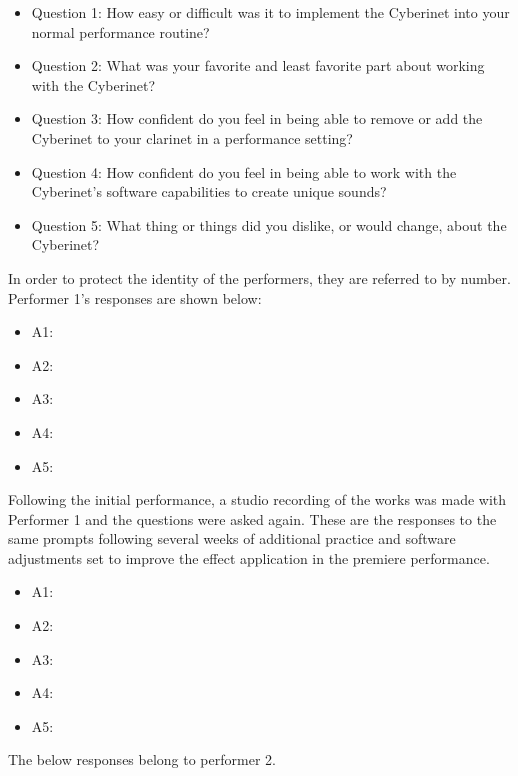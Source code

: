 \begin{itemize}
    \item Question 1: How easy or difficult was it to implement the Cyberinet into your normal performance routine?
    \item Question 2: What was your favorite and least favorite part about working with the Cyberinet? 
    \item Question 3: How confident do you feel in being able to remove or add the Cyberinet to your clarinet in a performance setting?
    \item Question 4: How confident do you feel in being able to work with the Cyberinet's software capabilities to create unique sounds?
    \item Question 5: What thing or things did you dislike, or would change, about the Cyberinet?
\end{itemize}

In order to protect the identity of the performers, they are referred to by number. Performer 1's responses are shown below: %

\begin{itemize}
    \item A1:
    \item A2:
    \item A3:
    \item A4:
    \item A5:
\end{itemize}

Following the initial performance, a studio recording of the works was made with Performer 1 and the questions were asked again. These are the responses to the same prompts following several weeks of additional practice and software adjustments set to improve the effect application in the premiere performance. 

\begin{itemize}
    \item A1:
    \item A2:
    \item A3:
    \item A4:
    \item A5:
\end{itemize}

The below responses belong to performer 2. %

